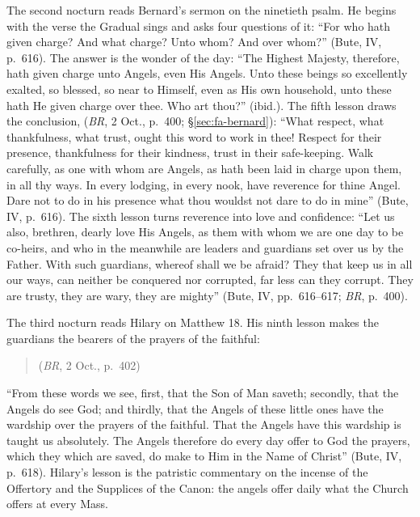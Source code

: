 The second nocturn reads Bernard's sermon on the ninetieth psalm. He
begins with the verse the Gradual sings and asks four questions of it:
``For who hath given charge? And what charge? Unto whom? And over whom?''
(Bute, IV, p.~616). The answer is the wonder of the day: ``The Highest
Majesty, therefore, hath given charge unto Angels, even His Angels. Unto
these beings so excellently exalted, so blessed, so near to Himself, even
as His own household, unto these hath He given charge over thee. Who art
thou?'' (ibid.). The fifth lesson draws the conclusion, 
(\emph{BR}, 2 Oct., p.~400;
\S\ref{sec:fa-bernard}): ``What respect, what thankfulness, what trust, ought this word to work in
thee! Respect for their presence, thankfulness for their kindness, trust
in their safe-keeping. Walk carefully, as one with whom are Angels, as
hath been laid in charge upon them, in all thy ways. In every lodging, in
every nook, have reverence for thine Angel. Dare not to do in his
presence what thou wouldst not dare to do in mine'' (Bute, IV, p.~616).
The sixth lesson turns reverence into love and confidence: ``Let us also,
brethren, dearly love His Angels, as them with whom we are one day to be
co-heirs, and who in the meanwhile are leaders and guardians set over us
by the Father. With such guardians, whereof shall we be afraid? They that
keep us in all our ways, can neither be conquered nor corrupted, far less
can they corrupt. They are trusty, they are wary, they are mighty''
(Bute, IV, pp.~616--617; \emph{BR}, p.~400).

The third nocturn reads Hilary on Matthew 18. His ninth lesson makes the
guardians the bearers of the prayers of the faithful:
\begin{quote}
 (\emph{BR}, 2 Oct., p.~402)
\end{quote}
``From these words we see, first, that the Son of Man saveth; secondly,
that the Angels do see God; and thirdly, that the Angels of these little
ones have the wardship over the prayers of the faithful. That the Angels
have this wardship is taught us absolutely. The Angels therefore do every
day offer to God the prayers, which they which are saved, do make to Him
in the Name of Christ'' (Bute, IV, p.~618). Hilary's lesson is the
patristic commentary on the incense of the Offertory and the Supplices of
the Canon: the angels offer daily what the Church offers at every Mass.

